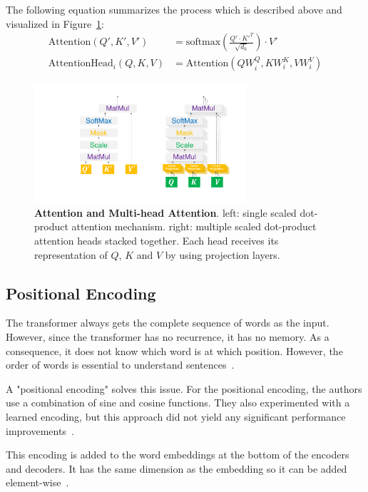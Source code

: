 The following equation summarizes the process which is described above and visualized in Figure~\ref{fig:03_transformer_scaledDotProduct}:
\begin{align}
    \text{Attention}(Q', K', V') & = \text{softmax}(\frac{Q' \cdot K'^T}{\sqrt{d_k}}) \cdot V' \\
    \text{AttentionHead}_i(Q, K, V) & = \text{Attention}(QW_i^Q, KW_i^K, VW_i^V)
\end{align}

\begin{figure}[htp]
    \centering
    \includegraphics[width=0.7\textwidth]{figures/03_theory/03_transformer_ScaledDot}
    \caption{\textbf{Attention and Multi-head Attention}. left: single scaled dot-product attention mechanism. right: multiple scaled dot-product attention heads stacked together. Each head receives its representation of $Q$, $K$ and $V$ by using projection layers.}
    \label{fig:03_transformer_scaledDotProduct}
\end{figure}

\subsection{Positional Encoding}

The transformer always gets the complete sequence of words as the input. However, since the transformer has no recurrence, it has no memory. As a consequence, it does not know which word is at which position. However, the order of words is essential to understand sentences~\cite{Vaswani2017d}. 
\medskip

A "positional encoding" solves this issue. For the positional encoding, the authors use a combination of sine and cosine functions. They also experimented with a learned encoding, but this approach did not yield any significant performance improvements~\cite{Vaswani2017d}.

This encoding is added to the word embeddings at the bottom of the encoders and decoders. It has the same dimension as the embedding so it can be added element-wise~\cite{Vaswani2017d}.


